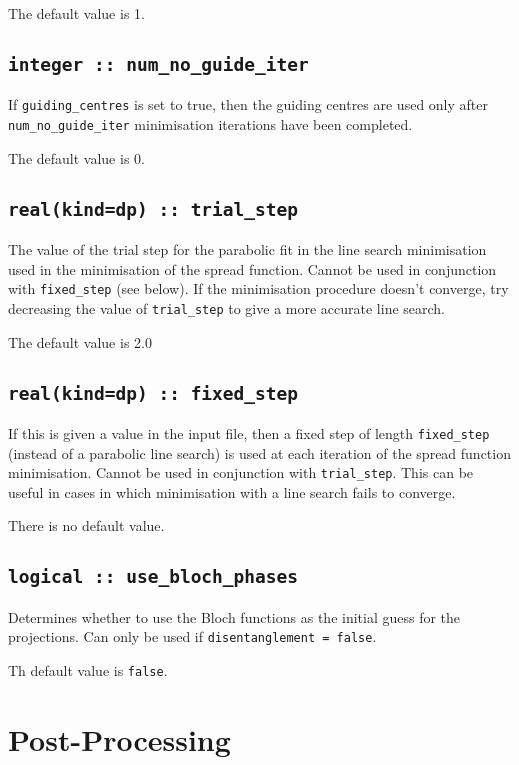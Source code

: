 The default value is 1.

\subsection[num\_no\_guide\_iter]{\tt integer :: num\_no\_guide\_iter}
If \verb#guiding_centres# is set to true, then the
guiding centres are used only after \verb#num_no_guide_iter#
minimisation iterations have been completed.

The default value is 0.

\subsection[trial\_step]{\tt real(kind=dp) :: trial\_step}
The value of the trial step for the parabolic fit in the line
search minimisation used in the minimisation of the spread
function. Cannot be used in conjunction with \verb#fixed_step# (see
below). If the minimisation procedure doesn't converge, try decreasing
the value of \verb#trial_step# to give a more accurate line search.

The default value is 2.0

\subsection[fixed\_step]{\tt real(kind=dp) :: fixed\_step}
If this is given a value in the input file, then a fixed step of length
\verb#fixed_step# (instead of a parabolic
line search) is used at each iteration of the spread function
minimisation. Cannot be used in conjunction with
\verb#trial_step#. This can be useful in cases in which minimisation
with a line search fails to converge.

There is no default value.

\subsection[use\_bloch\_phases]{\tt logical :: use\_bloch\_phases}

Determines whether to use the Bloch functions as the
initial guess for the projections. Can only be used if
\verb#disentanglement = false#. 

Th default value is \verb#false#.


\section{Post-Processing}
\label{sec:post-p}

